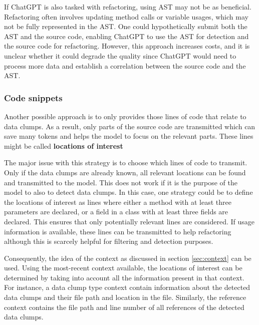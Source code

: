 If ChatGPT is also tasked with refactoring, using \ac{AST} may not be as beneficial. Refactoring often involves updating method calls or variable usages, which may not be fully represented in the \ac{AST}. One could hypothetically submit both the \ac{AST} and the source code, enabling ChatGPT to use the \ac{AST} for detection and the source code for refactoring. However, this approach increases costs, and it is unclear whether it could degrade the quality since ChatGPT would need to process more data and establish a correlation between the source code and the \ac{AST}.



\subsubsection{Code snippets}\label{sec:code_snippets}


Another possible approach is to only provides those lines of code that relate to data clumps. As a result, only parts of the source code are transmitted which can save many tokens and helps the model to focus on the relevant parts. These lines might be called \textbf{locations of interest}



The major issue with this strategy is to choose which lines of code to transmit. Only if the data clumps are already known, all relevant locations can be found and transmitted to the model. This does not work if it is the purpose of the model to also to detect data clumps. In this case, one strategy could be to define the locations of interest as lines where either a method with at least three parameters are declared, or a field in a class with at least three fields are declared. This ensures that only potentially relevant lines are considered. If usage information is available, these lines can be transmitted to help refactoring although this is scarcely helpful for filtering and detection purposes. 

Consequently, the idea of the context as discussed in section \ref{sec:context} can be used. Using the most-recent context available, the locations of interest can be determined by taking into account all the information present in that context. For instance, a data clump type context contain information about the detected data clumps and their file path and location in the file. Similarly, the reference context contains the file path and line number of all references of the detected data clumps.




